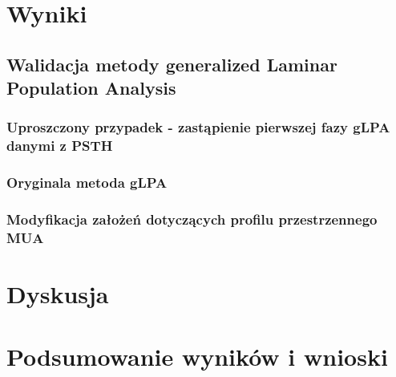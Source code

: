 \documentclass[a4paper,12pt,polish]{book}
\begin{document}
\chapter{Wyniki}
\section{Walidacja metody generalized Laminar Population Analysis}
\subsection{Uproszczony przypadek - zastąpienie pierwszej fazy gLPA danymi z PSTH}
\subsection{Oryginala metoda gLPA}
\subsection{Modyfikacja założeń dotyczących profilu przestrzennego MUA}


\chapter{Dyskusja}

\chapter{Podsumowanie wyników i wnioski}






\end{document}
